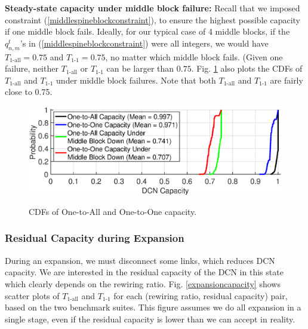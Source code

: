 \documentclass[letterpaper,twocolumn,10pt]{article}
\begin{document}
{\bf Steady-state capacity under middle block failure:}
Recall that we imposed constraint (\ref{middlespineblockconstraint}), to ensure the highest possible capacity if one middle block fails. Ideally, for our typical case of 4 middle blocks, if the $q^t_{n,m}$'s in (\ref{middlespineblockconstraint}) were all integers, we would have $T_{\text{1-all}}=0.75$ and $T_{\text{1-1}}=0.75$, no matter which middle block fails. (Given one failure, neither $T_{\text{1-all}}$ or $T_{\text{1-1}}$ can be larger than $0.75$. Fig. \ref{throughput} also plots the CDFs of $T_{\text{1-all}}$ and $T_{\text{1-1}}$ under middle block failures. Note that both $T_{\text{1-all}}$ and $T_{\text{1-1}}$ are fairly close to 0.75.


\begin{figure}[ht]
  \centering
  \includegraphics[scale=0.32]{throughput}\\
  \vspace{-1ex}
\caption{CDFs of One-to-All and One-to-One capacity.}\label{throughput}
\end{figure}

\subsubsection{Residual Capacity during Expansion}
During an expansion, we must disconnect some links, which reduces DCN capacity. We are interested in the residual capacity of the DCN in this state which clearly depends on the rewiring ratio. Fig. \ref{expansioncapacity}  shows scatter plots of  $T_{\text{1-all}}$ and $T_{\text{1-1}}$ for each (rewiring ratio, residual capacity) pair, based on the two benchmark suites.  This figure assumes we do all expansion in a single stage, even if the residual capacity is lower than we can accept in reality.
\end{document}
